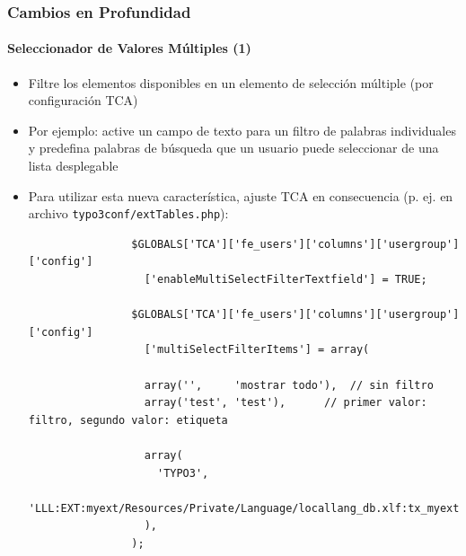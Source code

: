 \begin{frame}[fragile]
	\frametitle{Cambios en Profundidad}
	\framesubtitle{Seleccionador de Valores Múltiples (1)}

	\begin{itemize}
		\item Filtre los elementos disponibles en un elemento de selección múltiple (por configuración TCA)
		\item Por ejemplo: active un campo de texto para un filtro de palabras individuales y predefina palabras de búsqueda que un usuario puede seleccionar de una lista desplegable

		\item Para utilizar esta nueva característica, ajuste TCA en consecuencia\newline
			(p. ej. en archivo \texttt{typo3conf/extTables.php}):

			\lstset{
				basicstyle=\tiny\ttfamily
			}

			\begin{lstlisting}
				$GLOBALS['TCA']['fe_users']['columns']['usergroup']['config']
				  ['enableMultiSelectFilterTextfield'] = TRUE;

				$GLOBALS['TCA']['fe_users']['columns']['usergroup']['config']
				  ['multiSelectFilterItems'] = array(

				  array('',     'mostrar todo'),  // sin filtro
				  array('test', 'test'),      // primer valor: filtro, segundo valor: etiqueta

				  array(
				    'TYPO3',
				    'LLL:EXT:myext/Resources/Private/Language/locallang_db.xlf:tx_myext.label.typo3'
				  ),
				);
			\end{lstlisting}

	\end{itemize}

\end{frame}


